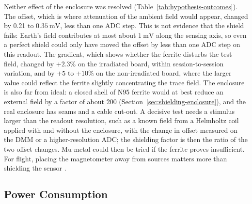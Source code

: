 \documentclass[12pt,a4paper]{article}
\begin{document}
Neither effect of the enclosure was resolved (Table~\ref{tab:hypothesis-outcomes}). The offset, which is where attenuation of the ambient field would appear, changed by 0.21 to $\SI{0.35}{\milli\volt}$, less than one ADC step. This is not evidence that the shield fails: Earth's field contributes at most about $\SI{1}{\milli\volt}$ along the sensing axis, so even a perfect shield could only have moved the offset by less than one ADC step on this readout. The gradient, which shows whether the ferrite disturbs the test field, changed by $+2.3\%$ on the irradiated board, within session-to-session variation, and by $+5$ to $+10\%$ on the non-irradiated board, where the larger value could reflect the ferrite slightly concentrating the trace field. The enclosure is also far from ideal: a closed shell of N95 ferrite would at best reduce an external field by a factor of about 200 (Section~\ref{sec:shielding-enclosure}), and the real enclosure has seams and a cable cut-out. A decisive test needs a stimulus larger than the readout resolution, such as a known field from a Helmholtz coil applied with and without the enclosure, with the change in offset measured on the DMM or a higher-resolution ADC; the shielding factor is then the ratio of the two offset changes. Mu-metal could then be tried if the ferrite proves insufficient. For flight, placing the magnetometer away from sources matters more than shielding the sensor \cite{nss_magnetometer}.

\subsection{Power Consumption}
\label{sec:disc-power}
\end{document}
